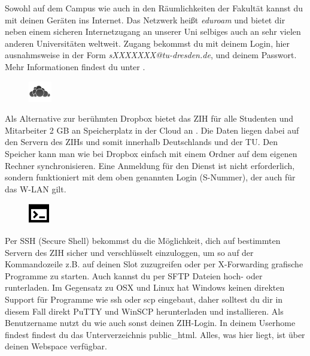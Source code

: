 Sowohl auf dem Campus wie auch in den Räumlichkeiten der Fakultät kannst du mit deinen Geräten ins Internet.
Das Netzwerk heißt \textit{eduroam} und bietet dir neben einem sicheren Internetzugang an unserer Uni selbiges auch an sehr vielen anderen Universitäten weltweit.
Zugang bekommst du mit deinem Login, hier ausnahmsweise in der Form \textit{sXXXXXXX@tu-dresden.de}, und deinem Passwort. Mehr Informationen findest du unter .

\newpage


\begin{figure}%
  \vspace{-0.5cm}%
  \centering%
  \includegraphics[width=1cm]{img/icons/owncloud.png}%
  \vspace{-0.5cm}%
\end{figure}

Als Alternative zur berühmten Dropbox bietet das ZIH für alle Studenten und Mitarbeiter 2 GB an Speicherplatz in der Cloud an . Die Daten liegen dabei auf den Servern des ZIHs und somit innerhalb Deutschlands und der TU. Den Speicher kann man wie bei Dropbox einfach mit einem Ordner auf dem eigenen Rechner synchronisieren. Eine Anmeldung für den Dienst ist nicht erforderlich, sondern funktioniert mit dem oben genannten Login (S-Nummer), der auch für das W-LAN gilt.


\begin{figure}%
  \vspace{-0.4cm}%
  \centering%
  \includegraphics[width=0.9cm]{img/icons/prompt.pdf}%
  \vspace{-0.4cm}%
\end{figure}

Per SSH (Secure Shell) bekommst du die Möglichkeit, dich auf bestimmten Servern des ZIH sicher und verschlüsselt einzuloggen, um so auf der Kommandozeile z.B. auf deinen Slot zuzugreifen oder per X-Forwarding grafische Programme zu starten.
Auch kannst du per SFTP Dateien hoch- oder runterladen.
Im Gegensatz zu OSX und Linux hat Windows keinen direkten Support für Programme wie ssh oder scp eingebaut, daher solltest du dir in diesem Fall direkt PuTTY und WinSCP herunterladen und installieren.
Als Benutzername nutzt du wie auch sonst deinen ZIH-Login.
In deinem Userhome findest findest du das Unterverzeichnis public\_html.
Alles, was hier liegt, ist über deinen Webspace verfügbar.

